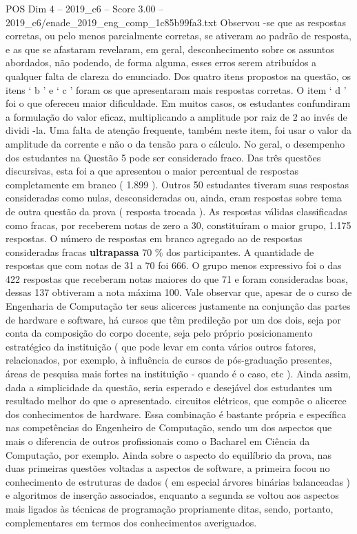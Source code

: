 \begin{textsample}{POS Dim 4 – 2019\_c6 – Score 3.00 – 2019\_c6/enade\_2019\_eng\_comp\_1c85b99fa3.txt}
Observou -se que as respostas corretas, ou pelo menos parcialmente corretas, se ativeram ao padrão de resposta, e as que se afastaram revelaram, em geral, desconhecimento sobre os assuntos abordados, não podendo, de forma alguma, esses erros serem atribuídos a qualquer falta de clareza do enunciado.
Dos quatro itens propostos na questão, os itens ‘ b ’ e ‘ c ’ foram os que apresentaram mais respostas corretas.
O item ‘ d ’ foi o que ofereceu maior dificuldade.
Em muitos casos, os estudantes confundiram a formulação do valor eficaz, multiplicando a amplitude por raiz de 2 ao invés de dividi -la.
Uma falta de atenção frequente, também neste item, foi usar o valor da amplitude da corrente e não o da tensão para o cálculo.
No geral, o desempenho dos estudantes na Questão 5 pode ser considerado fraco.
Das três questões discursivas, esta foi a que apresentou o maior percentual de respostas completamente em branco ( 1.899 ).
Outros 50 estudantes tiveram suas respostas consideradas como nulas, desconsideradas ou, ainda, eram respostas sobre tema de outra questão da prova ( resposta trocada ).
As respostas válidas classificadas como fracas, por receberem notas de zero a 30, constituíram o maior grupo, 1.175 respostas.
O número de respostas em branco agregado ao de respostas consideradas fracas \textbf{ultrapassa} 70 \% dos participantes.
A quantidade de respostas que com notas de 31 a 70 foi 666.
O grupo menos expressivo foi o das 422 respostas que receberam notas maiores do que 71 e foram consideradas boas, dessas 137 obtiveram a nota máxima 100.
Vale observar que, apesar de o curso de Engenharia de Computação ter seus alicerces justamente na conjunção das partes de hardware e software, há cursos que têm predileção por um dos dois, seja por conta da composição do corpo docente, seja pelo próprio posicionamento estratégico da instituição ( que pode levar em conta vários outros fatores, relacionados, por exemplo, à influência de cursos de pós-graduação presentes, áreas de pesquisa mais fortes na instituição - quando é o caso, etc ).
Ainda assim, dada a simplicidade da questão, seria esperado e desejável dos estudantes um resultado melhor do que o apresentado. circuitos elétricos, que compõe o alicerce dos conhecimentos de hardware.
Essa combinação é bastante própria e específica nas competências do Engenheiro de Computação, sendo um dos aspectos que mais o diferencia de outros profissionais como o Bacharel em Ciência da Computação, por exemplo.
Ainda sobre o aspecto do equilíbrio da prova, nas duas primeiras questões voltadas a aspectos de software, a primeira focou no conhecimento de estruturas de dados ( em especial árvores binárias balanceadas ) e algoritmos de inserção associados, enquanto a segunda se voltou aos aspectos mais ligados às técnicas de programação propriamente ditas, sendo, portanto, complementares em termos dos conhecimentos averiguados.

\end{textsample}
